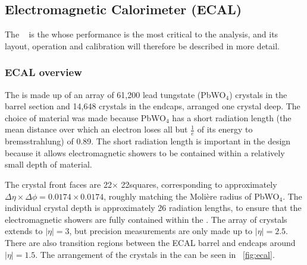 \subsection{Electromagnetic Calorimeter (ECAL)}
\label{sec:cms:ecal}

The \ECAL~\cite{CMSTDR,CMSEcalTDR} is the \subdetector whose performance is the most critical to the \Hgg analysis, and its layout, operation and calibration will therefore be described in more detail. 

\subsubsection{ECAL overview}
\label{sec:cms:ecal:overview}

The \ECAL is made up of an array of 61,200 lead tungstate (PbWO$_4$) crystals in the barrel section and 14,648 crystals in the endcaps, arranged one crystal deep. The choice of material was made because PbWO$_4$ has a short radiation length (the mean distance over which an electron loses all but $\frac{1}{e}$ of its energy to bremsstrahlung) of 0.89\cm. The short radiation length is important in the \ECAL design because it allows electromagnetic showers to be contained within a relatively small depth of material. 

The \ECAL crystal front faces are 22\mm $\times$ 22\mm squares, corresponding to approximately $\Delta \eta \times \Delta \phi = 0.0174 \times 0.0174$, roughly matching the Moli\`ere radius of PbWO$_4$. The individual crystal depth is approximately 26 radiation lengths, to ensure that the electromagnetic showers are fully contained within the \ECAL. The array of crystals extends to $|\eta| = 3$, but precision measurements are only made up to $|\eta| =2.5$. There are also transition regions between the ECAL barrel and endcaps around $|\eta| = 1.5$. The arrangement of the crystals in the \ECAL can be seen in \Fig~\ref{fig:ecal}.

